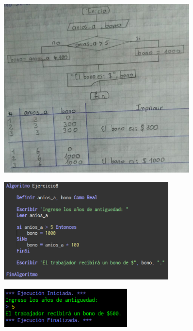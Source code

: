 \documentclass[12pt]{article}
\begin{document}
\begin{enumerate}
                \begin{figure}[!h]
                    \centering
                    \includegraphics[width=0.9\textwidth]{Img/DF_ej8.jpeg}
                \end{figure}

                \newpage
                \begin{figure}[!h]
                    \centering
                    \includegraphics[width=0.8\textwidth]{Img/Cod_ej8.png}
                \end{figure}

                \begin{figure}[!h]
                    \centering
                    \includegraphics[width=0.6\textwidth]{Img/Ejec_ej8.png}
                \end{figure}
           

\end{enumerate}
\end{document}
